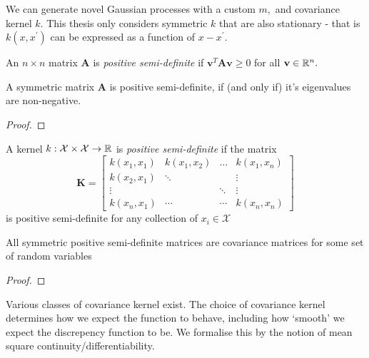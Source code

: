 We can generate novel Gaussian processes with a custom $m,$ and
covariance kernel $k.$ This thesis only considers symmetric
$k$ that are also stationary - that is $k(x, x^\prime)$ can be expressed as a
function of $x - x^\prime.$

\color{red}

\begin{definition}\label{def:pos_def_mat}
    An $n\times n$ matrix $\mathbf{A}$ is \emph{positive semi-definite} if
    $\mathbf{v}^T\mathbf{A}\mathbf{v} \geq 0$ for all $\mathbf{v}\in\mathbb{R}^n.$
\end{definition}

\begin{theorem}
    A symmetric matrix $\mathbf{A}$ is positive semi-definite, if (and only if)
    it's eigenvalues are non-negative.
\end{theorem}
\begin{proof}
\end{proof}

\begin{definition}\label{def:pos_def_ker}
    A kernel $k:\mathcal{X}\times\mathcal{X}\to\mathbb{R}$ is
    \emph{positive semi-definite} if the matrix
    $$\mathbf{K} = \begin{bmatrix}
            k(x_1, x_1) & k(x_1, x_2) & \dots  & k(x_1, x_n) \\
            k(x_2, x_1) & \ddots      &        & \vdots      \\
            \vdots      &             & \ddots & \vdots      \\
            k(x_n, x_1) & \cdots      & \cdots & k(x_n, x_n)
        \end{bmatrix}$$
    is positive semi-definite for any collection of $x_i\in\mathcal{X}$
\end{definition}

\begin{theorem}
    All symmetric positive semi-definite matrices are covariance matrices for
    some set of random variables
\end{theorem}
\begin{proof}
\end{proof}

\color{black}

Various classes of covariance kernel exist. The choice of covariance kernel
determines how we expect the function to behave, including how `smooth' we
expect the discrepency function to be. We formalise this by the notion of mean
square continuity/differentiability.

